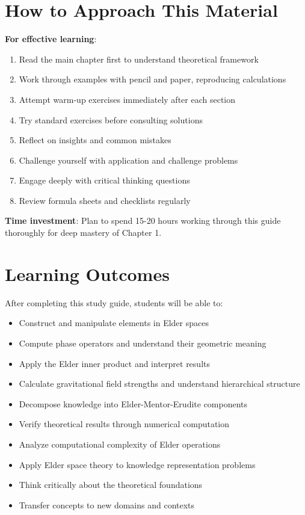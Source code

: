 \documentclass[12pt,a4paper]{book}
\theoremstyle{definition}
\theoremstyle{remark}
\begin{document}
\section*{How to Approach This Material}

\textbf{For effective learning}:
\begin{enumerate}
\item Read the main chapter first to understand theoretical framework
\item Work through examples with pencil and paper, reproducing calculations
\item Attempt warm-up exercises immediately after each section
\item Try standard exercises before consulting solutions
\item Reflect on insights and common mistakes
\item Challenge yourself with application and challenge problems
\item Engage deeply with critical thinking questions
\item Review formula sheets and checklists regularly
\end{enumerate}

\textbf{Time investment}: Plan to spend 15-20 hours working through this guide thoroughly for deep mastery of Chapter 1.

\section*{Learning Outcomes}

After completing this study guide, students will be able to:
\begin{itemize}
\item Construct and manipulate elements in Elder spaces
\item Compute phase operators and understand their geometric meaning
\item Apply the Elder inner product and interpret results
\item Calculate gravitational field strengths and understand hierarchical structure
\item Decompose knowledge into Elder-Mentor-Erudite components
\item Verify theoretical results through numerical computation
\item Analyze computational complexity of Elder operations
\item Apply Elder space theory to knowledge representation problems
\item Think critically about the theoretical foundations
\item Transfer concepts to new domains and contexts
\end{itemize}
\end{document}
